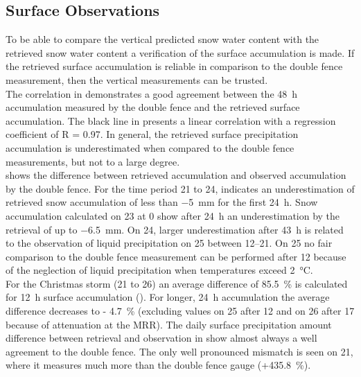 \subsection{Surface Observations} \label{sec:ret_dofe_comp}
To be able to compare the vertical predicted snow water content with the retrieved snow water content a verification of the surface accumulation is made. If the retrieved surface accumulation is reliable in comparison to the double fence measurement, then the vertical measurements can be trusted.
\\
The correlation in  demonstrates a good agreement between the \SI{48}{\hour} accumulation measured by the double fence and the retrieved surface accumulation.
The black line in  presents a linear correlation with a regression coefficient of R = \num{0.97}. 
In general, the retrieved surface precipitation accumulation is underestimated when compared to the double fence measurements, but not to a large degree. 
\\
 shows the difference between retrieved accumulation and observed accumulation by the double fence. For the time period \num{21} to \SI{24}{\dec},  indicates an underestimation of retrieved snow accumulation of less than \SI{-5}{\mm} for the first \SI{24}{\hour}. 
Snow accumulation calculated on \SI{23}{\dec} at \SI{0}{\UTC} show after \SI{24}{\hour} an underestimation by the retrieval of up to \SI{-6.5}{\mm}. On \SI{24}{\dec}, larger underestimation after \SI{43}{\hour} is related to the observation of liquid precipitation on \SI{25}{\dec} between \SIrange{12}{21}{\UTC}. On \SI{25}{\dec} no fair comparison to the double fence measurement can be performed after \SI{12}{\UTC} because of the neglection of liquid precipitation when temperatures exceed \SI{2}{\celsius}.
\\
For the Christmas storm (\num{21} to \SI{26}{\dec}) an average difference of \SI{85.5}{\percent} is calculated for \SI{12}{\hour} surface accumulation %
(). For longer, \SI{24}{\hour} accumulation the average difference decreases to \SI{- 4.7}{\percent} (excluding values on \SI{25}{\dec} after \SI{12}{\UTC} and on \SI{26}{\dec} after \SI{17}{\UTC} because of attenuation at the MRR). The daily surface precipitation amount difference between retrieval and observation in  show almost always a well agreement to the double fence. The only well pronounced mismatch is seen on \SI{21}{\dec}, where it measures much more than the double fence gauge (+\SI{435.8}{\percent}).
